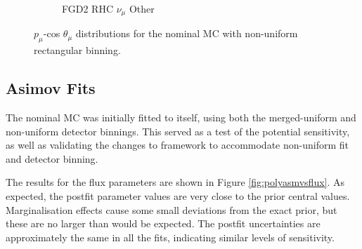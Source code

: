 \begin{figure}
\begin{subfigure}{.32\textwidth}
  \caption{FGD2 RHC $\nu_{\mu}$ Other}
  \label{fig:th2polynomFGD2_NuMuBkg_CCOther_in_AntiNu_Mode}
\end{subfigure}
\caption{$p_{\mu}$-cos $\theta_{\mu}$ distributions for the nominal MC with non-uniform rectangular binning.}
\label{fig:th2polynombin}
\end{figure}

\subsection{Asimov Fits}

The nominal MC was initially fitted to itself, using both the merged-uniform and non-uniform detector binnings. This served as a test of the potential sensitivity, as well as validating the changes to framework to accommodate non-uniform fit and detector binning. 

The results for the flux parameters are shown in Figure \ref{fig:polyasmvsflux}. As expected, the postfit parameter values are very close to the prior central values. Marginalisation effects cause some small deviations from the exact prior, but these are no larger than would be expected. The postfit uncertainties are approximately the same in all the fits, indicating similar levels of sensitivity.

